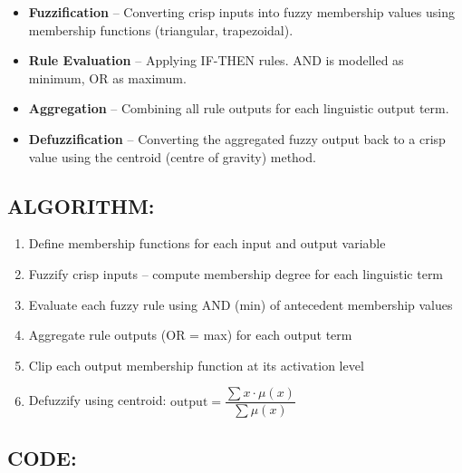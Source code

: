 \documentclass[12pt,a4paper]{article}
\begin{document}
\begin{itemize}
    \item \textbf{Fuzzification} -- Converting crisp inputs into fuzzy membership values using membership functions (triangular, trapezoidal).
    \item \textbf{Rule Evaluation} -- Applying IF-THEN rules. AND is modelled as minimum, OR as maximum.
    \item \textbf{Aggregation} -- Combining all rule outputs for each linguistic output term.
    \item \textbf{Defuzzification} -- Converting the aggregated fuzzy output back to a crisp value using the centroid (centre of gravity) method.
\end{itemize}

\subsection{ALGORITHM:}

\begin{enumerate}
    \item Define membership functions for each input and output variable
    \item Fuzzify crisp inputs -- compute membership degree for each linguistic term
    \item Evaluate each fuzzy rule using AND (min) of antecedent membership values
    \item Aggregate rule outputs (OR = max) for each output term
    \item Clip each output membership function at its activation level
    \item Defuzzify using centroid: $\text{output} = \dfrac{\sum x \cdot \mu(x)}{\sum \mu(x)}$
\end{enumerate}

\subsection{CODE:}
\end{document}
